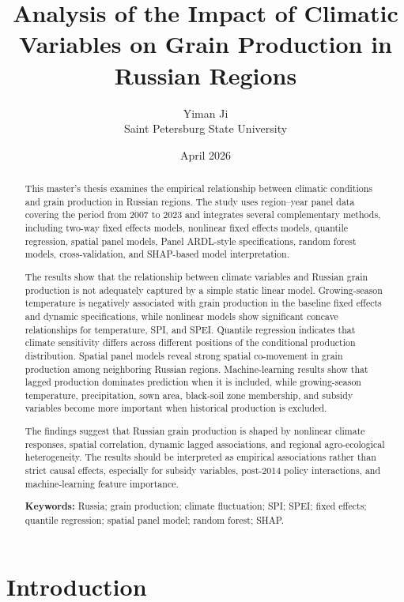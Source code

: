 \documentclass[12pt,a4paper]{article}
\title{\textbf{Analysis of the Impact of Climatic Variables on Grain Production in Russian Regions}}
\author{Yiman Ji\\Saint Petersburg State University}
\date{April 2026}
\begin{document}
\maketitle

\begin{abstract}
This master's thesis examines the empirical relationship between climatic conditions and grain production in Russian regions. The study uses region--year panel data covering the period from 2007 to 2023 and integrates several complementary methods, including two-way fixed effects models, nonlinear fixed effects models, quantile regression, spatial panel models, Panel ARDL-style specifications, random forest models, cross-validation, and SHAP-based model interpretation.

The results show that the relationship between climate variables and Russian grain production is not adequately captured by a simple static linear model. Growing-season temperature is negatively associated with grain production in the baseline fixed effects and dynamic specifications, while nonlinear models show significant concave relationships for temperature, SPI, and SPEI. Quantile regression indicates that climate sensitivity differs across different positions of the conditional production distribution. Spatial panel models reveal strong spatial co-movement in grain production among neighboring Russian regions. Machine-learning results show that lagged production dominates prediction when it is included, while growing-season temperature, precipitation, sown area, black-soil zone membership, and subsidy variables become more important when historical production is excluded.

The findings suggest that Russian grain production is shaped by nonlinear climate responses, spatial correlation, dynamic lagged associations, and regional agro-ecological heterogeneity. The results should be interpreted as empirical associations rather than strict causal effects, especially for subsidy variables, post-2014 policy interactions, and machine-learning feature importance.

\textbf{Keywords:} Russia; grain production; climate fluctuation; SPI; SPEI; fixed effects; quantile regression; spatial panel model; random forest; SHAP.
\end{abstract}

\newpage
\tableofcontents
\newpage

\section{Introduction}
\end{document}
